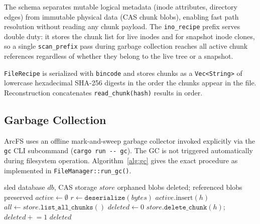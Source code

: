 \documentclass[journal]{IEEEtran}
\begin{document}
The schema separates mutable logical metadata (inode attributes,
directory edges) from immutable physical data (CAS chunk blobs),
enabling fast path resolution without reading any chunk payload.
The \texttt{ino\_recipe} prefix serves double duty: it stores the
chunk list for live inodes and for snapshot inode clones, so a single
\texttt{scan\_prefix} pass during garbage collection reaches all active
chunk references regardless of whether they belong to the live tree or
a snapshot.

\texttt{FileRecipe} is serialized with \texttt{bincode} and stores chunks
as a \texttt{Vec\textless{}String\textgreater{}} of lowercase hexadecimal
SHA-256 digests in the order the chunks appear in the file.
Reconstruction concatenates \texttt{read\_chunk(hash)} results in order.

\subsection{Garbage Collection}
\label{sec:gc}

ArcFS uses an offline mark-and-sweep garbage collector invoked explicitly
via the \texttt{gc} CLI subcommand (\texttt{cargo run -{}- gc}).  The GC
is not triggered automatically during filesystem operation.  Algorithm~\ref{alg:gc}
gives the exact procedure as implemented in \texttt{FileManager::run\_gc()}.

\begin{algorithm}
\caption{Offline Garbage Collection (\texttt{run\_gc()})}
\label{alg:gc}
\small
\begin{algorithmic}[1]
\REQUIRE sled database $\mathit{db}$, CAS storage $\mathit{store}$
\ENSURE orphaned blobs deleted; referenced blobs preserved
\STATE $\mathit{active} \leftarrow \emptyset$ \; 
  \STATE $r \leftarrow \texttt{deserialize}(\mathit{bytes})$
    \STATE $\mathit{active}.\text{insert}(h)$
  \ENDFOR
\ENDFOR
\STATE $\mathit{all} \leftarrow \mathit{store}.\texttt{list\_all\_chunks}()$
\STATE $\mathit{deleted} \leftarrow 0$
    \STATE $\mathit{store}.\texttt{delete\_chunk}(h)$;\;
           $\mathit{deleted} \mathrel{+}= 1$
  \ENDIF
\ENDFOR
\RETURN $\mathit{deleted}$
\end{algorithmic}
\end{algorithm}
\end{document}
